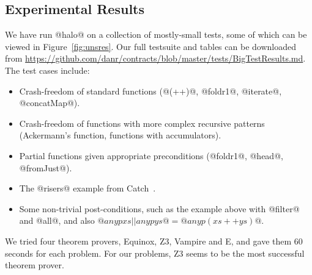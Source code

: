 \subsection{Experimental Results}



We have run @halo@ on a collection of mostly-small tests, 
some of which can be 
viewed in Figure~\ref{fig:unsres}. Our full testsuite and tables can be downloaded from
\url{https://github.com/danr/contracts/blob/master/tests/BigTestResults.md}.
The test cases include:
\begin{itemize}
  \item Crash-freedom of standard functions
    (@(++)@, @foldr1@, @iterate@, @concatMap@).

  \item Crash-freedom of functions with more complex recursive patterns
        (Ackermann's function, functions with accumulators).

%

  \item Partial functions given appropriate preconditions
        (@foldr1@, @head@, @fromJust@).

  \item The @risers@ example from Catch~\citep{Mitchell:2008:PBE:1411286.1411293}.

  \item Some non-trivial post-conditions, such as the example above with @filter@ and @all@,
        and also $@any p xs || any p ys@ = @any p (xs ++ ys)@$.
\end{itemize}

We tried four theorem provers, Equinox, Z3, Vampire and E, and gave
them 60 seconds for each problem. For our problems, Z3 seems to be the most
successful theorem prover.

